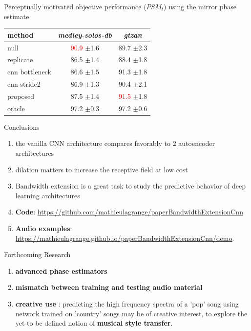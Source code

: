 \documentclass[compress]{beamer}
\begin{document}
\begin{frame}{Perceptually motivated objective performance ($PSM_t$) using the mirror phase estimate}
  \begin{center}
  \begin{tabular}{lcc}
  method & \textit{medley-solos-db} & \textit{gtzan} \\
  \hline
  null & \textcolor{red}{90.9} $\pm$1.6 & 89.7 $\pm$2.3  \\
  replicate & 86.5 $\pm$1.4 & 88.4 $\pm$1.8 \\
  \hline
  cnn bottleneck & 86.6 $\pm$1.5 & 91.3 $\pm$1.8 \\
  cnn stride2 & 86.9 $\pm$1.3 & 90.4 $\pm$2.1 \\
  \hline
  proposed & 87.5 $\pm$1.4 & \textcolor{red}{91.5} $\pm$1.8 \\
  \hline
  oracle & 97.2 $\pm$0.3 & 97.2 $\pm$0.6 \\
\end{tabular}
  \end{center}
\end{frame}

\begin{frame}{Conclusions}
\begin{enumerate}
  \item the vanilla CNN architecture compares favorably to 2 autoencoder architectures
  \item dilation matters to increase the receptive field at low cost
  \item Bandwidth extension is a great task to study the predictive behavior of deep learning architectures
  \item \textbf{Code}: \url{https://github.com/mathieulagrange/paperBandwidthExtensionCnn}
  \item \textbf{Audio examples}: \url{https://mathieulagrange.github.io/paperBandwidthExtensionCnn/demo}.
\end{enumerate}
\end{frame}

\begin{frame}{Forthcoming Research}
\begin{enumerate}
  \item \textbf{advanced phase estimators}
  \item \textbf{mismatch between training and testing audio material}
  \item \textbf{creative use} : predicting the high frequency spectra of a 'pop' song using network trained on 'country' songs may be of creative interest, to explore the yet to be defined notion of \textbf{musical style transfer}.
\end{enumerate}
\end{frame}

% 
\end{document}

